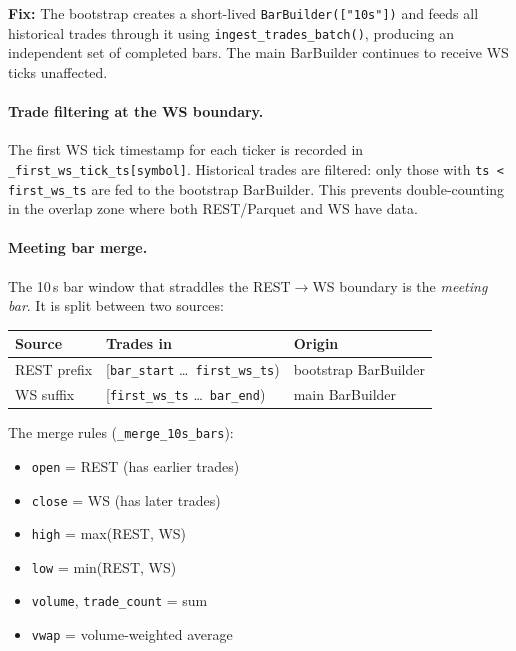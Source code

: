\documentclass[a4paper, 11pt]{article}
\begin{document}
\noindent\textbf{Fix:} The bootstrap creates a short-lived \texttt{BarBuilder(["10s"])} and feeds
all historical trades through it using \texttt{ingest\_trades\_batch()}, producing
an independent set of completed bars.  The main BarBuilder continues to receive WS
ticks unaffected.

\paragraph{Trade filtering at the WS boundary.}
The first WS tick timestamp for each ticker is recorded in
\texttt{\_first\_ws\_tick\_ts[symbol]}.  Historical trades are filtered:
only those with \texttt{ts < first\_ws\_ts} are fed to the bootstrap BarBuilder.
This prevents double-counting in the overlap zone where both REST/Parquet and
WS have data.

\paragraph{Meeting bar merge.}
The 10\,s bar window that straddles the REST$\to$WS boundary is the
\emph{meeting bar}.  It is split between two sources:

\begin{center}
\begin{tabular}{lll}
    \textbf{Source} & \textbf{Trades in} & \textbf{Origin} \\
    \hline
    REST prefix  & [\texttt{bar\_start} \ldots\ \texttt{first\_ws\_ts}) & bootstrap BarBuilder \\
    WS suffix    & [\texttt{first\_ws\_ts} \ldots\ \texttt{bar\_end}) & main BarBuilder \\
\end{tabular}
\end{center}

\noindent The merge rules (\texttt{\_merge\_10s\_bars}):
\begin{itemize}[nosep]
    \item \texttt{open} = REST (has earlier trades)
    \item \texttt{close} = WS (has later trades)
    \item \texttt{high} = max(REST, WS)
    \item \texttt{low} = min(REST, WS)
    \item \texttt{volume}, \texttt{trade\_count} = sum
    \item \texttt{vwap} = volume-weighted average
\end{itemize}
\end{document}
